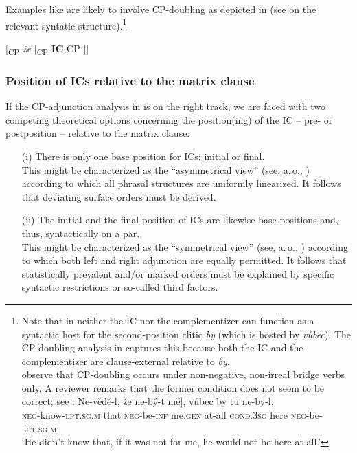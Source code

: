\documentclass[output=paper,colorlinks,citecolor=brown,
modfonts,newtxmath
]{langscibook}
\begin{document}
\noindent Examples like  are likely to involve CP-doubling as depicted in  (see \citealt{Kaspar2016} on the relevant syntatic structure).\footnote{Note that in  neither the IC nor the complementizer can function as a syntactic host for the second-position clitic \textit{by} (which is hosted by \textit{vůbec}). The CP-doubling analysis in  captures this because both the IC and the complementizer are clause-external relative to \textit{by}.\\ \citet{IatridouKroch1992} observe that CP-doubling occurs under non-negative, non-irreal bridge verbs only. A reviewer remarks that the former condition does not seem to be correct; see : 
\ea\label{ex:reviewer}
\gll Ne-vědě-l, že \minsp{[} ne-bý-t mě], vůbec by tu ne-by-l.\\ 
     \textsc{neg}-know-\textsc{lpt.sg.m} that {} \textsc{neg}-be-\textsc{inf} me.\textsc{gen} at-all \textsc{cond.3sg} here \textsc{neg}-be-\textsc{lpt.sg.m}\\
\glt `He didn't know that, if it was not for me, he would not be here at all.'
\z}

\ea\label{tree:CPdoubling}
{[\textsubscript{CP} \textit{že} [\textsubscript{CP} \textbf{IC} CP ]]}
\z


\subsubsection{Position of ICs relative to the matrix clause}\label{sec:syntax_external_position}

If the CP-adjunction analysis in  is on the right track, we are faced with two competing theoretical options concerning the position(ing) of the IC -- pre- or postposition -- relative to the matrix clause:

\begin{itemize}

\item[(i)] There is only one base position for ICs: initial or final.\\ This might be characterized as the ``asymmetrical view'' (see, a.\,o., \citealt{Kayne1994}) according to which all phrasal structures are uniformly linearized. It follows that deviating surface orders must be derived.

\item[(ii)] The initial and the final position of ICs are likewise base positions and, thus, syntactically on a par.\\ This might be characterized as the ``symmetrical view'' (see, a.\,o., \citealt{Chomsky1986,Chomsky2004}) according to which both left and right adjunction are equally permitted. It follows that statistically prevalent and/or marked orders must be explained by specific syntactic restrictions or so-called third factors.

\end{itemize}
\end{document}

